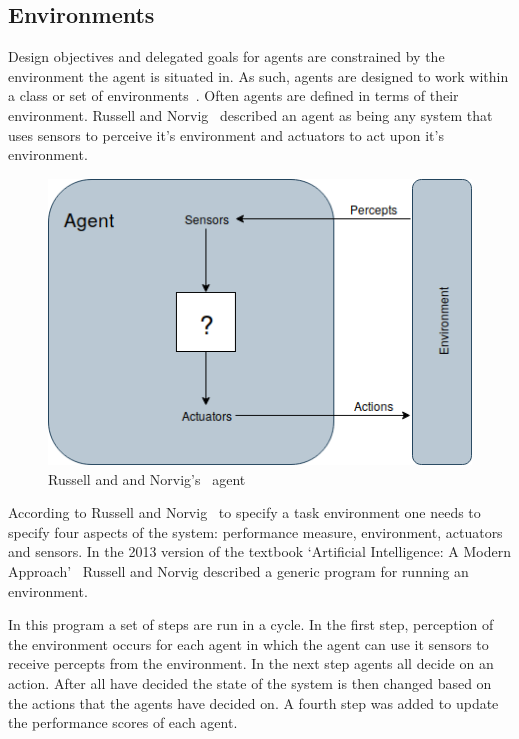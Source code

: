 \documentclass[]{final_report}
\begin{document}
\subsection{Environments}
Design objectives and delegated goals for agents are constrained by the environment the agent is situated in. As such, agents are designed to work within a class or set of environments~\cite{russell2016artificial}. Often agents are defined in terms of their environment. Russell and Norvig~\cite{russell2016artificial} described an agent as being any system that uses sensors to perceive it's environment and actuators to act upon it's environment.\par
\begin{figure}
\vspace{-20pt}
\begin{framed}
	\center
	\includegraphics[width=\textwidth]{russellnorvigagent.png}
	\caption{Russell and and Norvig's~\cite{russell2016artificial} agent}
	\label{fig:rnagent}
\end{framed}
\vspace{-20pt}
\end{figure}
According to Russell and Norvig~\cite{russell2016artificial} to specify a task environment one needs to specify four aspects of the system: performance measure, environment, actuators and sensors. In the 2013 version of the textbook `Artificial Intelligence: A Modern Approach'~\cite{russell2011artificial} Russell and Norvig described a generic program for running an environment.\par 
In this program a set of steps are run in a cycle. In the first step, perception of the environment occurs for each agent in which the agent can use it sensors to receive percepts from the environment. In the next step agents all decide on an action. After all have decided the state of the system is then changed based on the actions that the agents have decided on. A fourth step was added to update the performance scores of each agent.\par 
\end{document}
